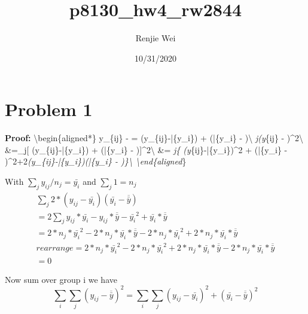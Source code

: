 \documentclass[
]{article}
\title{p8130\_hw4\_rw2844}
\author{Renjie Wei}
\date{10/31/2020}
\begin{document}
\maketitle

\hypertarget{problem-1}{%
\section{Problem 1}\label{problem-1}}

\textbf{\textbf{Proof:}} \textbackslash begin\{aligned*\} y\_\{ij\} -
 = (y\_\{ij\}-\bar\{y\_i\}) + (\bar\{y\_i\} -
)\textbackslash{} \sum\emph{j(y}\{ij\} -
)\^{}2\textbackslash{} \&=\sum\_j{[}
(y\_\{ij\}-\bar\{y\_i\}) + (\bar\{y\_i\} -
){]}\^{}2\textbackslash{} \&= \sum\emph{j\{
(y}\{ij\}-\bar\{y\_i\})\^{}2 + (\bar\{y\_i\} -
)\^{}2+2\emph{(y\_\{ij\}-\bar\{y\_i\})(\bar\{y\_i\} -
)\}\textbackslash{} \textbackslash end\{aligned}\}

With \(\sum_j y_{ij}/n_j = \bar{y_i}\) and \(\sum_j 1= n_j\)
\[\begin{aligned}
\sum_j{2*(y_{ij}-\bar{y_i})(\bar{y_i} - \overline{\bar{y}})}\\
= 2\sum_j y_{ij}*\bar{y_i} - y_{ij}*\overline{\bar{y}} - 
\bar{y_i}^2 + \bar{y_i}*\overline{\bar{y}}\\
=2*n_j*\bar{y_i}^2 - 2*n_j*\bar{y_i}*\overline{\bar{y}} - 
2*n_j*\bar{y_i}^2 + 2*n_j*\bar{y_i}*\overline{\bar{y}}\\
rearrange = 2*n_j*\bar{y_i}^2 - 2*n_j*\bar{y_i}^2 
+ 2*n_j*\bar{y_i}*\overline{\bar{y}}-2*n_j*\bar{y_i}*\overline{\bar{y}}\\
= 0
\end{aligned}\]

Now sum over group i we have
\[ \sum_i\sum_j(y_{ij} - \overline{\bar{y}})^2 = \sum_i\sum_j(y_{ij}-\bar{y_i})^2 + (\bar{y_i} - \overline{\bar{y}})^2\]
\end{document}
